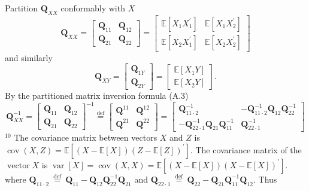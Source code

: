 \documentclass[10pt]{article}
\begin{document}
Partition $\boldsymbol{Q}_{X X}$ conformably with $X$
$$
\boldsymbol{Q}_{X X}=\left[\begin{array}{ll}
\boldsymbol{Q}_{11} & \boldsymbol{Q}_{12} \\
\boldsymbol{Q}_{21} & \boldsymbol{Q}_{22}
\end{array}\right]=\left[\begin{array}{ll}
\mathbb{E}\left[X_{1} X_{1}^{\prime}\right] & \mathbb{E}\left[X_{1} X_{2}^{\prime}\right] \\
\mathbb{E}\left[X_{2} X_{1}^{\prime}\right] & \mathbb{E}\left[X_{2} X_{2}^{\prime}\right]
\end{array}\right]
$$
and similarly
$$
\boldsymbol{Q}_{X Y}=\left[\begin{array}{l}
\boldsymbol{Q}_{1 Y} \\
\boldsymbol{Q}_{2 Y}
\end{array}\right]=\left[\begin{array}{c}
\mathbb{E}\left[X_{1} Y\right] \\
\mathbb{E}\left[X_{2} Y\right]
\end{array}\right] .
$$
By the partitioned matrix inversion formula (A.3)
$$
\boldsymbol{Q}_{X X}^{-1}=\left[\begin{array}{ll}
\boldsymbol{Q}_{11} & \boldsymbol{Q}_{12} \\
\boldsymbol{Q}_{21} & \boldsymbol{Q}_{22}
\end{array}\right]^{-1} \stackrel{\operatorname{def}}{=}\left[\begin{array}{ll}
\boldsymbol{Q}^{11} & \boldsymbol{Q}^{12} \\
\boldsymbol{Q}^{21} & \boldsymbol{Q}^{22}
\end{array}\right]=\left[\begin{array}{cc}
\boldsymbol{Q}_{11 \cdot 2}^{-1} & -\boldsymbol{Q}_{11 \cdot 2}^{-1} \boldsymbol{Q}_{12} \boldsymbol{Q}_{22}^{-1} \\
-\boldsymbol{Q}_{22 \cdot 1}^{-1} \boldsymbol{Q}_{21} \boldsymbol{Q}_{11}^{-1} & \boldsymbol{Q}_{22 \cdot 1}^{-1}
\end{array}\right]
$$
${ }^{10}$ The covariance matrix between vectors $X$ and $Z$ is $\operatorname{cov}(X, Z)=\mathbb{E}\left[(X-\mathbb{E}[X])(Z-\mathbb{E}[Z])^{\prime}\right]$. The covariance matrix of the $\operatorname{vector} X$ is $\operatorname{var}[X]=\operatorname{cov}(X, X)=\mathbb{E}\left[(X-\mathbb{E}[X])(X-\mathbb{E}[X])^{\prime}\right]$. where $\boldsymbol{Q}_{11 \cdot 2} \stackrel{\text { def }}{=} \boldsymbol{Q}_{11}-\boldsymbol{Q}_{12} \boldsymbol{Q}_{22}^{-1} \boldsymbol{Q}_{21}$ and $\boldsymbol{Q}_{22 \cdot 1} \stackrel{\text { def }}{=} \boldsymbol{Q}_{22}-\boldsymbol{Q}_{21} \boldsymbol{Q}_{11}^{-1} \boldsymbol{Q}_{12}$. Thus
\end{document}
